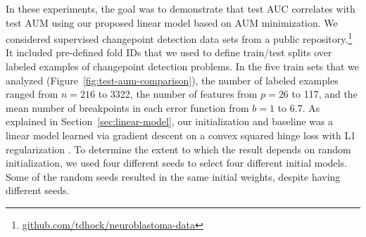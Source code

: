\documentclass{article}
\begin{document}
In these experiments, the goal was to demonstrate that test AUC correlates with test AUM using our proposed linear model based on AUM minimization.
We considered supervised changepoint detection data sets from a public repository.\footnote{\small\href{https://github.com/tdhock/neuroblastoma-data}{github.com/tdhock/neuroblastoma-data}} 
It included pre-defined fold IDs that we used to define train/test splits over labeled examples of changepoint detection problems.
In the five train sets that we analyzed (Figure~\ref{fig:test-aum-comparison}), the number of labeled examples ranged from $n=216$ to 3322, the number of features from $p=26$ to 117, and the mean number of breakpoints in each error function from $b=1$ to 6.7.
As explained in Section~\ref{sec:linear-model}, our initialization and baseline was a linear model learned via gradient descent on a convex squared hinge loss with L1 regularization \citep{Hocking2013icml}.
To determine the extent to which the result depends on random initialization, we used four different seeds to select four different initial models. 
Some of the random seeds resulted in the same initial weights, despite having different seeds.
\end{document}
